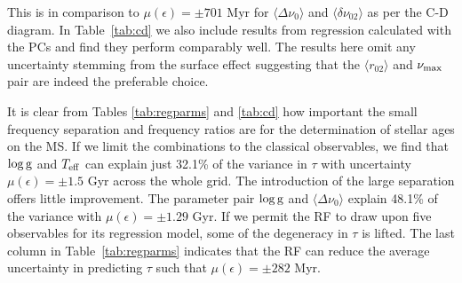 This is in comparison to $\mu (\epsilon) = \pm 701$ Myr for $\langle\Delta\nu_0\rangle$ and $\langle\delta\nu_{02}\rangle$  as per the C-D diagram. 
In Table~\ref{tab:cd} we also include results from regression calculated with the PCs and find they perform comparably well. The results here omit any uncertainty stemming from the surface effect suggesting that the $\langle r_{02}\rangle$ and $\nu_{\rm{max}}$ pair are indeed the preferable choice. 




It is clear from Tables \ref{tab:regparms} and \ref{tab:cd}  how important the small frequency separation and frequency ratios are for the determination of stellar ages on the MS. 
If we limit the combinations to the classical observables, we find that  $\log \rm{g}$ and $T_{\rm{eff}}$ can explain just 32.1\% of the variance in $\tau$ with uncertainty $\mu (\epsilon) = \pm 1.5$ Gyr across the whole grid. The introduction of the large separation offers little improvement. The parameter pair $\log \rm{g}$ and $\langle\Delta\nu_0\rangle$  explain 48.1\% of the variance with  $\mu (\epsilon) = \pm 1.29$ Gyr.
If we permit the RF to draw upon five observables for its regression model, some of the degeneracy in $\tau$ is lifted.  The last column in Table~\ref{tab:regparms}
indicates that the RF can reduce the average uncertainty in predicting  $\tau$ such that  $\mu (\epsilon) =\pm 282$ Myr.

